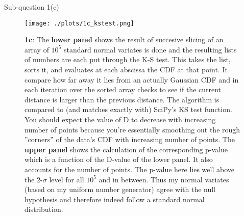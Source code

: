 \begin{subsection}{Sub-question 1(c)}
\begin{figure}[h!]
  \centering
  \texttt{[image: ./plots/1c\_kstest.png]}
  \caption{\textbf{1c}: The \textbf{lower panel} shows the result of succesive slicing of an array of $10^5$ standard normal variates is done and the resulting lists of numbers are each put through the K-S test. This takes the list, sorts it, and evaluates at each abscissa the CDF at that point. It compare how far away it lies from an actually Gaussian CDF and in each iteration over the sorted array checks to see if the current distance is larger than the previous distance. The algorithm is compared to (and matches exactly with) SciPy's KS test function. You should expect the value of D to decrease with increasing number of points because you're essentially smoothing out the rough ''corners'' of the data's CDF with increasing number of points. The \textbf{upper panel} shows the calculation of the corresponding p-value which is a function of the D-value of the lower panel. It also accounts for the number of points. The p-value here lies well above the 2-$\sigma$ level for all $10^5$ and in between. Thus my normal variates (based on my uniform number generator) agree with the null hypothesis and therefore indeed follow a standard normal distribution.}
  \label{fig:kstest}
\end{figure}


\end{subsection}

\FloatBarrier

